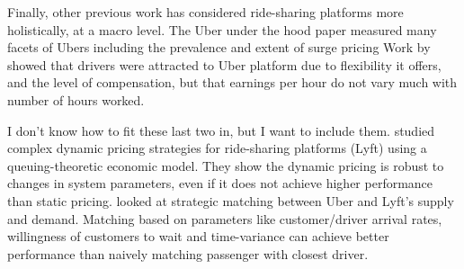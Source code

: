 Finally, other previous work has considered ride-sharing platforms more holistically, at a macro level.
The Uber under the hood paper measured many facets of Ubers including the prevalence and extent of surge pricing
Work by~\citeauthor{hall2016analysis} showed that drivers were attracted to Uber platform due to flexibility it offers, 
and the level of compensation, but that earnings per hour do not vary much with number of hours worked. 

I don't know how to fit these last two in, but I want to include them.
\citeauthor{banerjee2015pricing} studied complex dynamic pricing strategies for ride-sharing platforms (Lyft) using a queuing-theoretic economic model. They show the dynamic pricing is robust to changes in system parameters, even if it does not achieve higher performance than static pricing.  \citeauthor{ozkan2016dynamic} looked at strategic matching between Uber and Lyft's supply and demand. Matching based on parameters like customer/driver arrival rates, willingness of customers to wait and time-variance can achieve better performance than naively matching passenger with closest driver.


